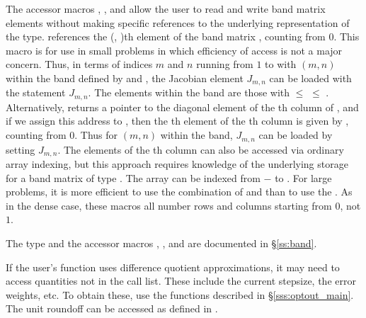 {{  The accessor macros , , and  
  allow the user to read and write band matrix elements without making specific 
  references to the underlying representation of the  type.
   references the (, )th element of the 
  band matrix , counting from $0$.
  This macro is for use in small problems in which efficiency of access is not
  a major concern.  Thus, in terms of indices $m$ and $n$ running from $1$ to
   with $(m,n)$ within the band defined by  and
  , the Jacobian element $J_{m,n}$ can be loaded with the 
  statement  $J_{m,n}$. The elements within
  the band are those with  $\le$  $\le$ .
  Alternatively,  returns a pointer to the diagonal element
  of the th column of , and if we assign this address to 
  , then the th element of the th column is
  given by , counting from $0$.
  Thus for $(m,n)$ within the band, $J_{m,n}$ can be loaded by setting 
    $J_{m,n}$.
  The elements of the th column can also be accessed
  via ordinary array indexing, but this approach requires knowledge of
  the underlying storage for a band matrix of type .  
  The array  can be indexed from $-$ to .
  For large problems, it is more efficient to use the combination of
   and  than to use the
  .  As in the dense case, these macros all number rows
  and columns starting from $0$, not $1$.  

  The  type and the accessor macros , , and
   are documented in \S\ref{ss:band}.

  If the user's  function uses difference quotient approximations,
  it may need to access quantities not in the call list. These include the current
  stepsize, the error weights, etc. To obtain these, use the  functions 
  described in \S\ref{sss:optout_main}. The unit roundoff can be accessed
  as  defined in .

}
}
